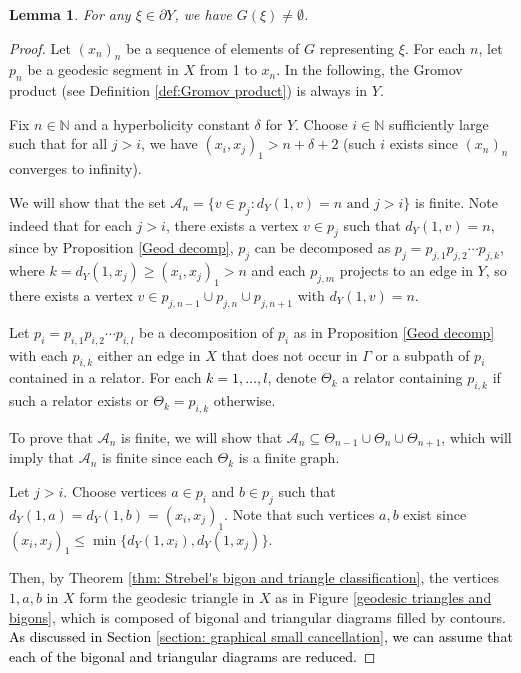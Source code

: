 \documentclass{article}[11pt]
\newtheorem{lem}[thm]{Lemma}
\newcommand{\N}{\mathbb{N}}
\begin{document}
{\begin{lem}
    \label{lemma: geodesic representatives for boundary}
    For any $\xi \in \partial Y$, we have $G(\xi) \neq \emptyset$.
    
\end{lem}

\begin{proof}
    Let $(x_n)_n$ be a sequence of elements of $G$ representing $\xi$. For each $n$, let $p_n$ be a geodesic segment in $X$ from 1 to $x_n$. {\color{black} In the following, the Gromov product (see Definition \ref{def:Gromov product}) is always in $Y$.}

    Fix $n \in \N$ and a hyperbolicity constant $\delta$ for $Y$. Choose $i \in \N$ sufficiently large such that for all $j > i$, we have $(x_i, x_j)_1 > n + \delta + 2$ (such $i$ exists since $(x_n)_n$ converges to infinity). 

    We will show that the set $\mathcal{A}_n = \{v \in p_j : d_Y(1,v) = n \text{ and } j > i\}$ is finite. Note indeed that for each $j > i$, there exists a vertex $v \in p_j$ such that $d_Y(1,v) = n$, since by Proposition \ref{Geod decomp}, $p_j$ can be decomposed as $p_j = p_{j,1} p_{j,2} \cdots p_{j,k}$, where $k = d_Y(1,x_j) \geq (x_i, x_j)_1 > n$ and each $p_{j,m}$ projects to an edge in $Y$, so there exists a vertex $v \in p_{j,n-1} \cup p_{j,n} \cup p_{j, n+1}$ with $d_Y(1,v) = n$. 

    Let $p_i = p_{i,1} p_{i,2} \cdots p_{i,l}$ be a decomposition of $p_i$ as in Proposition \ref{Geod decomp} with each $p_{i,k}$ either an edge in $X$ that does not occur in $\Gamma$ or a subpath of $p_i$ contained in a relator. For each \textcolor{black}{$k = 1,\ldots,l$}, denote $\Theta_k$ a relator containing $p_{i,k}$ if such a relator exists or $\Theta_k = p_{i,k}$ otherwise. 

    To prove that $\mathcal{A}_n$ is finite, we will show that $\mathcal{A}_n \subseteq \Theta_{n-1} \cup \Theta_n \cup \Theta_{n+1}$, which will imply that $\mathcal{A}_n$ is finite since each $\Theta_k$ is a finite graph.

    Let $j > i$. Choose vertices $a \in p_i$ and $b \in p_j$ such that $d_Y(1,a) = d_Y(1,b) = (x_i,x_j)_1$. Note that such vertices $a,b$ exist since $(x_i,x_j)_1 \leq \min\{d_Y(1,x_i), d_Y(1,x_j)\}$. 
    
    Then, by Theorem \ref{thm: Strebel's bigon and triangle classification}, the vertices $1,a,b$ in $X$ form the geodesic triangle in $X$ as in Figure \ref{geodesic triangles and bigons}, which is composed of bigonal and triangular diagrams filled by contours. \textcolor{black}{As discussed in Section \ref{section: graphical small cancellation}, we can assume that each of the bigonal and triangular diagrams are reduced.}


\end{proof}}
\end{document}

